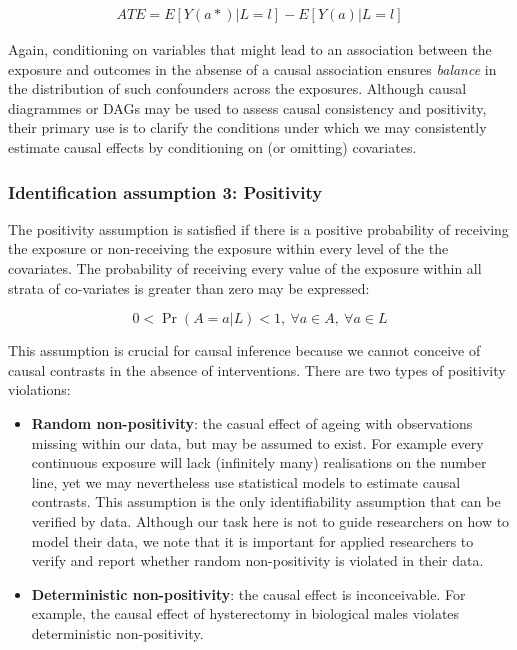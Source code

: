 \documentclass[
  singlecolumn]{report}
\begin{document}
\[
\begin{aligned}
ATE = E[Y(a*)|L = l] - E[Y(a)|L = l] 
\end{aligned}
\]

Again, conditioning on variables that might lead to an association
between the exposure and outcomes in the absense of a causal association
ensures \emph{balance} in the distribution of such confounders across
the exposures. Although causal diagrammes or DAGs may be used to assess
causal consistency and positivity, their primary use is to clarify the
conditions under which we may consistently estimate causal effects by
conditioning on (or omitting) covariates.

\hypertarget{identification-assumption-3-positivity}{%
\subsubsection{Identification assumption 3:
Positivity}\label{identification-assumption-3-positivity}}

The positivity assumption is satisfied if there is a positive
probability of receiving the exposure or non-receiving the exposure
within every level of the the covariates. The probability of receiving
every value of the exposure within all strata of co-variates is greater
than zero may be expressed:

\begin{equation}
0 < \Pr(A=a|L)<1, ~ \forall a \in A, ~ \forall a \in L
\end{equation}

This assumption is crucial for causal inference because we cannot
conceive of causal contrasts in the absence of interventions. There are
two types of positivity violations:

\begin{itemize}
\item
  \textbf{Random non-positivity}: the casual effect of ageing with
  observations missing within our data, but may be assumed to exist. For
  example every continuous exposure will lack (infinitely many)
  realisations on the number line, yet we may nevertheless use
  statistical models to estimate causal contrasts. This assumption is
  the only identifiability assumption that can be verified by data.
  Although our task here is not to guide researchers on how to model
  their data, we note that it is important for applied researchers to
  verify and report whether random non-positivity is violated in their
  data.
\item
  \textbf{Deterministic non-positivity}: the causal effect is
  inconceivable. For example, the causal effect of hysterectomy in
  biological males violates deterministic non-positivity.
\end{itemize}
\end{document}
